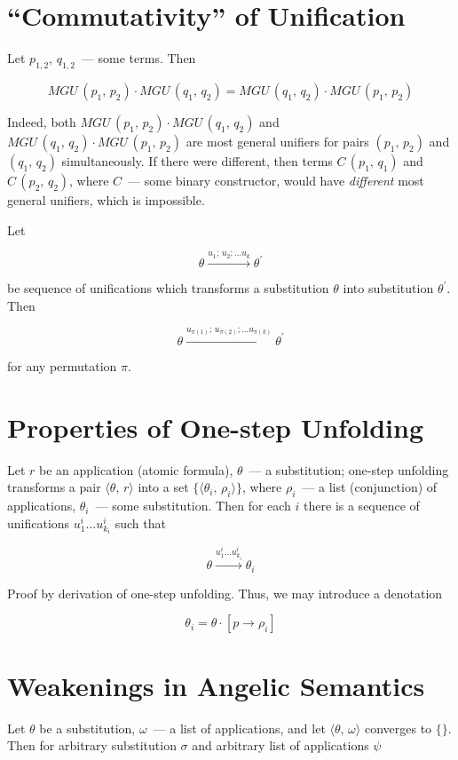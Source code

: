 \documentclass{article}[12pt]
\newcommand{\inbr}[1]{\langle #1 \rangle}
\begin{document}
\section{``Commutativity'' of Unification}

Let $p_{1,2},\,q_{1,2}$~--- some terms. Then

\[
MGU\,(p_1,\,p_2)\cdot MGU\,(q_1,\,q_2)=MGU\,(q_1,\,q_2)\cdot MGU\,(p_1,\,p_2)
\]

Indeed, both $MGU\,(p_1,\,p_2)\cdot MGU\,(q_1,\,q_2)$ and $MGU\,(q_1,\,q_2)\cdot MGU\,(p_1,\,p_2)$ are most general unifiers
for pairs $(p_1,\,p_2)$ and $(q_1,\,q_2)$ simultaneously. If there were different, then terms $C\,(p_1,\,q_1)$ and
$C\,(p_2,\,q_2)$, where $C$~--- some binary constructor, would have \emph{different} most general unifiers, which is impossible.

Let

\[
\theta\xrightarrow{u_1;\,u_2;\dots u_k}{\theta^\prime}
\]

be sequence of unifications which transforms a substitution $\theta$ into substitution $\theta^\prime$. Then

\[
\theta\xrightarrow{u_{\pi(1)};\,u_{\pi(2)};\dots u_{\pi(k)}}{\theta^\prime}
\]

for any permutation $\pi$.

\section{Properties of One-step Unfolding}

Let $r$ be an application (atomic formula), $\theta$~--- a substitution; one-step unfolding transforms a pair $\inbr{\theta,\,r}$ into
a set $\{\inbr{\theta_i,\,\rho_i}\}$, where $\rho_i$~--- a list (conjunction) of applications, $\theta_i$~--- some substitution. Then
for each $i$ there is a sequence of unifications $u^i_1\dots u^i_{k_i}$ such that

\[
\theta\xrightarrow{u^i_1\dots u^i_{k_i}}{\theta_i}
\]

Proof by derivation of one-step unfolding. Thus, we may introduce a denotation

\[
\theta_i=\theta\cdot[p\to\rho_i]
\]

\section{Weakenings in Angelic Semantics}

Let $\theta$ be a substitution, $\omega$~--- a list of applications, and let $\inbr{\theta,\,\omega}$ converges to $\{\}$. Then for arbitrary substitution $\sigma$ and
arbitrary list of applications $\psi$
\end{document}
